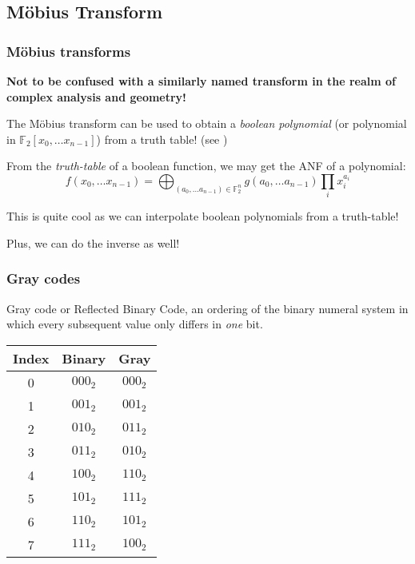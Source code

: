 \documentclass{beamer}
\begin{document}
\subsection{Möbius Transform}
\begin{frame}
    \frametitle{Möbius transforms}
    \textbf{Not to be confused with a similarly named transform in the realm of complex analysis and geometry!} 
    
    \pause

    The Möbius transform can be used to obtain a \textit{boolean polynomial} (or polynomial in $\mathbb{F}_2[x_0,\dots x_{n - 1}]$) from a truth table! (see \cite{joux2009algorithmic})
    
    \pause 

    From the \textit{truth-table} of a boolean function, we may get the ANF of a polynomial:
    $$
        f(x_0, \dots x_{n - 1}) = \bigoplus_{(a_0,\dots a_{n - 1}) \in \mathbb{F}_2^n} g(a_0, \dots a_{n - 1}) \prod_i x_i^{a_i}
    $$

    This is quite cool as we can interpolate boolean polynomials from a truth-table!
    
    \pause
    
    Plus, we can do the inverse as well!
\end{frame}

\begin{frame}
    \frametitle{Gray codes}
    Gray code or Reflected Binary Code, an ordering of the binary numeral system in which every subsequent value only differs in \textit{one} bit.

    \begin{center}
        \begin{tabular}{||c|c|c||}
            \hline
            Index & Binary & Gray \\
            \hline
            0 & $000_2$ & $000_2$\\
            1 & $001_2$ & $001_2$\\
            2 & $010_2$ & $011_2$\\
            3 & $011_2$ & $010_2$\\
            4 & $100_2$ & $110_2$\\
            5 & $101_2$ & $111_2$\\
            6 & $110_2$ & $101_2$\\
            7 & $111_2$ & $100_2$\\
            \hline
        \end{tabular}
    \end{center}
\end{frame}
\end{document}
